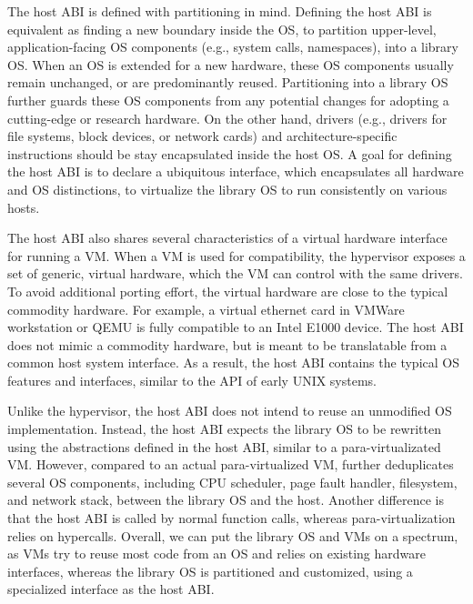The host ABI is defined with partitioning in mind.
Defining the host ABI 
is equivalent as finding a new boundary inside the OS,
to partition
upper-level, application-facing OS components (e.g., system calls, namespaces), into 
a library OS.
When an OS is extended for a new hardware,
these OS components usually remain unchanged, or are predominantly reused.
Partitioning
into a library OS further guards these OS components from any potential changes for adopting a cutting-edge or research hardware.
On the other hand,
drivers (e.g., drivers for file systems, block devices, or network cards)
and architecture-specific instructions
should be stay encapsulated inside the host OS.
A goal for defining the host ABI is to declare a ubiquitous interface,
which encapsulates all hardware and OS distinctions,
to virtualize the library OS to run consistently on various hosts.




The host ABI also shares several characteristics of a virtual hardware interface for running a VM.
When a VM is used for compatibility, the hypervisor exposes
a set of generic, virtual hardware,
which the VM can control with the same drivers.
To avoid additional porting effort, the virtual hardware are close to the typical commodity hardware.
For example, a virtual ethernet card in VMWare workstation or QEMU
is fully compatible to an Intel E1000 device.
The host ABI does not mimic a commodity hardware, but is meant to be translatable from a common host system interface. 
As a result, the host ABI contains the
typical OS features and interfaces, similar to the API of early UNIX systems.



Unlike the hypervisor, the host ABI does not intend to reuse an unmodified OS implementation.
Instead, the host ABI expects the library OS
to be rewritten using the abstractions defined in the host ABI,
similar to a 
para-virtualizated VM.
However, compared to an actual para-virtualized VM,
\graphene{} further deduplicates several OS components,
including CPU scheduler, page fault handler, filesystem, and network stack,
between the library OS and the host.
Another difference is that the host ABI is called by normal function calls, whereas para-virtualization relies on hypercalls.
Overall, we can put the \graphene{} library OS and VMs on a spectrum,
as VMs try to reuse most code from an OS and relies on existing hardware interfaces,
whereas the \graphene{} library OS
is partitioned and customized,
using a specialized interface as the host ABI.



